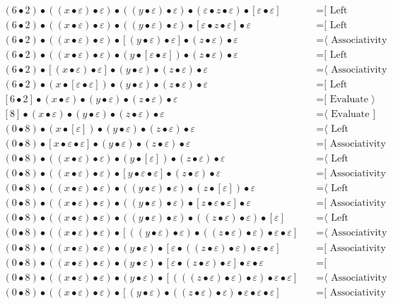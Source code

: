 \documentclass{article}
\begin{document}
\begin{align*}
(6 • 2) • ((x • ε) • ε) • ((y • ε) • ε) • (ε • z • ε) • [ε • ε]
  & \quad \text{=[ Left neutrality ⟩}\\
(6 • 2) • ((x • ε) • ε) • ((y • ε) • ε) • [ε • z • ε] • ε
  & \quad \text{=[ Left neutrality ⟩}\\
(6 • 2) • ((x • ε) • ε) • [(y • ε) • ε] • (z • ε) • ε
  & \quad \text{=⟨ Associativity ]}\\
(6 • 2) • ((x • ε) • ε) • (y • [ε • ε]) • (z • ε) • ε
  & \quad \text{=[ Left neutrality ⟩}\\
(6 • 2) • [(x • ε) • ε] • (y • ε) • (z • ε) • ε
  & \quad \text{=⟨ Associativity ]}\\
(6 • 2) • (x • [ε • ε]) • (y • ε) • (z • ε) • ε
  & \quad \text{=[ Left neutrality ⟩}\\
[6 • 2] • (x • ε) • (y • ε) • (z • ε) • ε
  & \quad \text{=[ Evaluate ⟩}\\
[8] • (x • ε) • (y • ε) • (z • ε) • ε
  & \quad \text{=⟨ Evaluate ]}\\
(0 • 8) • (x • [ε]) • (y • ε) • (z • ε) • ε
  & \quad \text{=⟨ Left neutrality ]}\\
(0 • 8) • [x • ε • ε] • (y • ε) • (z • ε) • ε
  & \quad \text{=[ Associativity ⟩}\\
(0 • 8) • ((x • ε) • ε) • (y • [ε]) • (z • ε) • ε
  & \quad \text{=⟨ Left neutrality ]}\\
(0 • 8) • ((x • ε) • ε) • [y • ε • ε] • (z • ε) • ε
  & \quad \text{=[ Associativity ⟩}\\
(0 • 8) • ((x • ε) • ε) • ((y • ε) • ε) • (z • [ε]) • ε
  & \quad \text{=⟨ Left neutrality ]}\\
(0 • 8) • ((x • ε) • ε) • ((y • ε) • ε) • [z • ε • ε] • ε
  & \quad \text{=[ Associativity ⟩}\\
(0 • 8) • ((x • ε) • ε) • ((y • ε) • ε) • ((z • ε) • ε) • [ε]
  & \quad \text{=⟨ Left neutrality ]}\\
(0 • 8) • ((x • ε) • ε) • [((y • ε) • ε) • ((z • ε) • ε) • ε • ε]
  & \quad \text{=⟨ Associativity ]}\\
(0 • 8) • ((x • ε) • ε) • (y • ε) • [ε • ((z • ε) • ε) • ε • ε]
  & \quad \text{=[ Associativity ⟩}\\
(0 • 8) • ((x • ε) • ε) • (y • ε) • [ε • (z • ε) • ε] • ε • ε
  & \quad \text{=[ Commutativity ⟩}\\
(0 • 8) • ((x • ε) • ε) • (y • ε) • [(((z • ε) • ε) • ε) • ε • ε]
  & \quad \text{=⟨ Associativity ]}\\
(0 • 8) • ((x • ε) • ε) • [(y • ε) • ((z • ε) • ε) • ε • ε • ε]
  & \quad \text{=[ Associativity ⟩}\\

\end{align*}
\end{document}
